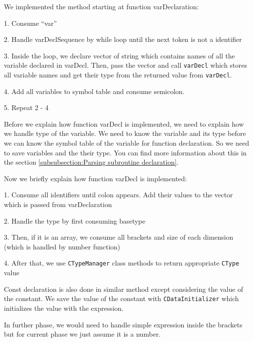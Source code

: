 \documentclass[12pt]{article}
\begin{document}
\begin{MyIndentedList}
    \item We implemented the method starting at function varDeclaration:
    \begin{MyIndentedList}
        \item 1. Consume “var”  
        \item 2. Handle varDeclSequence by while loop until the next token is not a identifier
        \item 3. Inside the loop, we declare vector of string which contains names of all the variable declared in varDecl.
        Then, pass the vector and call \texttt{varDecl} which stores all variable names and get their type from the returned value from \texttt{varDecl}.
        \item 4. Add all variables to symbol table and consume semicolon.
        \item 5. Repeat 2 - 4
    \end{MyIndentedList}
    \item Before we explain how function varDecl is implemented, we need to explain how we handle type of the variable.
    We need to know the variable and its type before we can know the symbol table of the variable for function declaration.
    So we need to save variables and the their type. You can find more information about this in the section \ref*{subsubsection:Parsing subroutine declaration}.
    \\
    \item Now we briefly explain how function varDecl is implemented:
    \begin{MyIndentedList}
        \item 1. Consume all identifiers until colon appears. Add their values to the vector which is passed from varDeclaration
        \item 2. Handle the type by first consuming basetype
        \item 3. Then, if it is an array, we consume all brackets and size of each dimension (which is handled by number function)
        \item 4. After that, we use \texttt{CTypeManager} class methods to return appropriate \texttt{CType} value
    \end{MyIndentedList}
    \item Const declaration is also done in similar method except considering the value of the constant.
    We save the value of the constant with \texttt{CDataInitializer} which initializes the value with the expression.
    \item  In further phase, we would need to handle simple expression inside the brackets but for current phase we just assume it is a number.  \\
\end{MyIndentedList}
\end{document}
